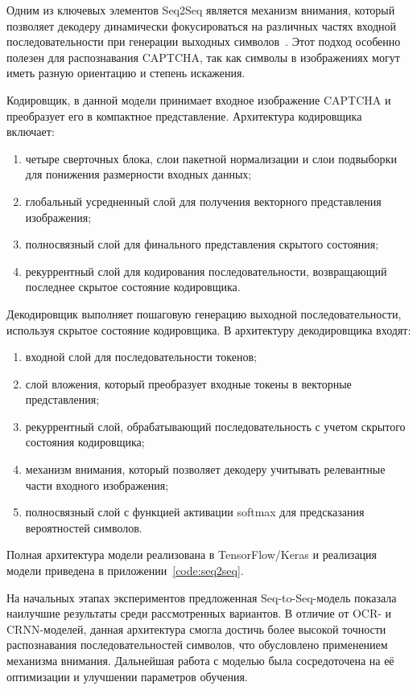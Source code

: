 \documentclass{altsu-report}
\begin{document}
Одним из ключевых элементов Seq2Seq является механизм внимания, который позволяет декодеру динамически фокусироваться на различных частях входной последовательности при генерации выходных символов~\cite{Seq2SeqBook}. Этот подход особенно полезен для распознавания CAPTCHA, так как символы в изображениях могут иметь разную ориентацию и степень искажения.

Кодировщик, в данной модели принимает входное изображение CAPTCHA и преобразует его в компактное представление. Архитектура кодировщика включает:
\begin{enumerate}
    \item четыре сверточных блока, слои пакетной нормализации и слои подвыборки для понижения размерности входных данных;
    \item глобальный усредненный слой для получения векторного представления изображения;
    \item полносвязный слой для финального представления скрытого состояния;
    \item рекуррентный слой для кодирования последовательности, возвращающий последнее скрытое состояние кодировщика.
\end{enumerate}

Декодировщик выполняет пошаговую генерацию выходной последовательности, используя скрытое состояние кодировщика. В архитектуру декодировщика входят:
\begin{enumerate}
    \item входной слой для последовательности токенов;
    \item слой вложения, который преобразует входные токены в векторные представления;
    \item рекуррентный слой, обрабатывающий последовательность с учетом скрытого состояния кодировщика;
    \item механизм внимания, который позволяет декодеру учитывать релевантные части входного изображения;
    \item полносвязный слой с функцией активации softmax для предсказания вероятностей символов.
\end{enumerate}

Полная архитектура модели реализована в TensorFlow/Keras и реализация модели приведена в приложении~\ref{code:seq2seq}.

На начальных этапах экспериментов предложенная Seq-to-Seq-модель показала наилучшие результаты среди рассмотренных вариантов. В отличие от OCR- и CRNN-моделей, данная архитектура смогла достичь более высокой точности распознавания последовательностей символов, что обусловлено применением механизма внимания. Дальнейшая работа с моделью была сосредоточена на её оптимизации и улучшении параметров обучения.
\end{document}
